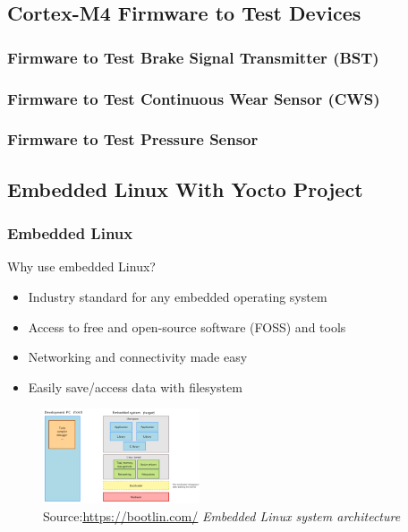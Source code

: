 \documentclass[8pt,compress]{beamer}
\begin{document}
\subsection{Cortex-M4 Firmware to Test Devices}
\begin{frame}
  \frametitle{Firmware to Test Brake Signal Transmitter (BST)}
\end{frame}

\begin{frame}
  \frametitle{Firmware to Test Continuous Wear Sensor (CWS)}
\end{frame}

\begin{frame}
  \frametitle{Firmware to Test Pressure Sensor}
\end{frame}

\subsection{Embedded Linux With Yocto Project}
\begin{frame}
  \frametitle{Embedded Linux}
  \hspace{-.5cm}
  \begin{minipage}{0.485\textwidth}
    \begin{block}{Why use embedded Linux?}
      \small{
      \begin{itemize}
        \item Industry standard for any embedded operating system
        \item Access to free and open-source software (FOSS) and tools
        \item Networking and connectivity made easy 
        \item Easily save/access data with filesystem
      \end{itemize}
      }
    \end{block}
  \end{minipage}
  \hfill
  \begin{minipage}{0.50\textwidth}
    \begin{figure}
      \centering
      \includegraphics[width=175px]{assets/diagrams/embedded_linux.png}
      \caption{\tiny Source:\underline{\href{https://bootlin.com/}{https://bootlin.com/}}\hspace{\textwidth}
      \textit{Embedded Linux system architecture}}
    \end{figure}
  \end{minipage}
\end{frame}
\end{document}
